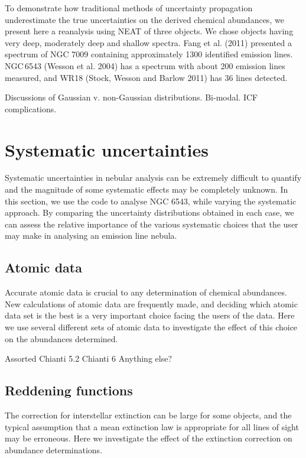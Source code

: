 \documentclass[]{../MNtemplate/mn2e}
\begin{document}
To demonstrate how traditional methods of uncertainty propagation underestimate the true uncertainties on the derived chemical abundances, we present here a reanalysis using NEAT of three objects.  We chose objects having very deep, moderately deep and shallow spectra.  Fang et al. (2011) presented a spectrum of NGC 7009 containing approximately 1300 identified emission lines.  NGC\,6543 (Wesson et al. 2004) has a spectrum with about 200 emission lines measured, and WR18 (Stock, Wesson and Barlow 2011) has 36 lines detected.

Discussions of Gaussian v. non-Gaussian distributions.  Bi-modal.  ICF complications.

\section{Systematic uncertainties}

Systematic uncertainties in nebular analysis can be extremely difficult to quantify and the magnitude of some systematic effects may be completely unknown.  In this section, we use the code to analyse NGC 6543, while varying the systematic approach.  By comparing the uncertainty distributions obtained in each case, we can assess the relative importance of the various systematic choices that the user may make in analysing an emission line nebula.

\subsection{Atomic data}

Accurate atomic data is crucial to any determination of chemical abundances.  New calculations of atomic data are frequently made, and deciding which atomic data set is the best is a very important choice facing the users of the data.  Here we use several different sets of atomic data to investigate the effect of this choice on the abundances determined.

Assorted
Chianti 5.2
Chianti 6
Anything else?

\subsection{Reddening functions}

The correction for interstellar extinction can be large for some objects, and the typical assumption that a mean extinction law is appropriate for all lines of sight may be erroneous.  Here we investigate the effect of the extinction correction on abundance determinations.
\end{document}
